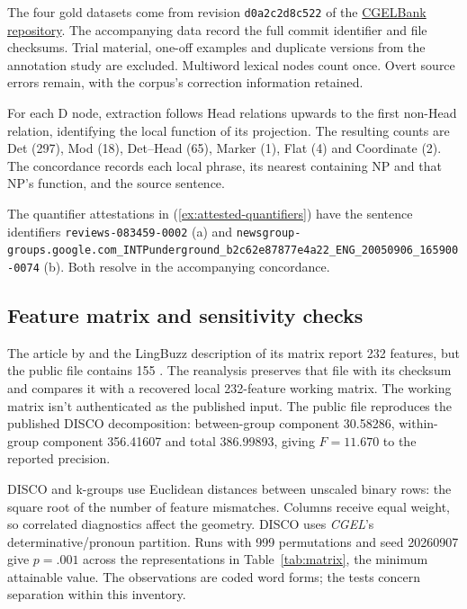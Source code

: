 \documentclass[12pt]{article}
\begin{document}
The four gold datasets come from revision \texttt{d0a2c2d8c522} of the \href{https://github.com/nert-nlp/cgel}{CGELBank repository}. The accompanying data record the full commit identifier and file checksums. Trial material, one-off examples and duplicate versions from the annotation study are excluded. Multiword lexical nodes count once. Overt source errors remain, with the corpus's correction information retained.

For each D node, extraction follows Head relations upwards to the first non-Head relation, identifying the local function of its projection. The resulting counts are Det (297), Mod (18), Det--Head (65), Marker (1), Flat (4) and Coordinate (2). The concordance records each local phrase, its nearest containing NP and that NP's function, and the source sentence.

The quantifier attestations in (\ref{ex:attested-quantifiers}) have the sentence identifiers \nolinkurl{reviews-083459-0002} (a) and \nolinkurl{newsgroup-groups.google.com_INTPunderground_b2c62e87877e4a22_ENG_20050906_165900-0074} (b). Both resolve in the accompanying concordance.

\subsection{Feature matrix and sensitivity checks}

The article by \textcite{reynolds2021} and the LingBuzz description of its matrix report 232 features, but the public file contains 155 \citep{reynolds2021matrixpublic}. The reanalysis preserves that file with its checksum and compares it with a recovered local 232-feature working matrix. The working matrix isn't authenticated as the published input. The public file reproduces the published DISCO decomposition: between-group component 30.58286, within-group component 356.41607 and total 386.99893, giving $F=11.670$ to the reported precision.

DISCO and k-groups use Euclidean distances between unscaled binary rows: the square root of the number of feature mismatches. Columns receive equal weight, so correlated diagnostics affect the geometry. DISCO uses \textit{CGEL}'s determinative/pronoun partition. Runs with 999 permutations and seed 20260907 give \mbox{$p=.001$} across the representations in Table~\ref{tab:matrix}, the minimum attainable value. The observations are coded word forms; the tests concern separation within this inventory.
\end{document}
